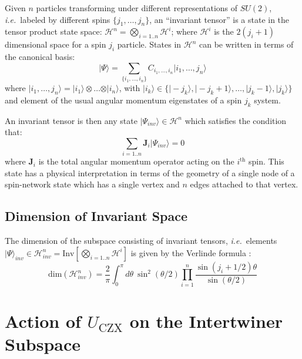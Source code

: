 \documentclass[preprint]{SciPost}
\newcommand{\ie}{\textit{i.e.}~}
\newcommand{\mc}[1]{\mathcal{#1}}
\newcommand{\vect}[1]{\boldsymbol{#1}}
\newcommand{\ket}[1]{\vert #1 \rangle}
\theoremstyle{plain} %
\begin{document}
Given $ n $ particles transforming under different representations of $ SU(2) $, \ie labeled by different spins $ \{j_1,\ldots,j_n \} $, an ``invariant tensor'' is a state in the tensor product state space: $ \mc{H}^n = \underset{i=1..n}{\bigotimes} \mc{H}^i $; where $ \mc{H}^i $ is the $ 2(j_i+1) $ dimensional space for a spin $ j_i $ particle. States in $ \mc{H}^n $ can be written in terms of the canonical basis:
\begin{equation}\label{eqn:n-body-state}
	\ket{\Psi} = \sum_{\{i_1,\ldots,i_n\}} C_{i_1,\ldots,i_n} \ket{i_1,\ldots,j_n}
\end{equation}
where $ \ket{i_1,\ldots,j_n} = \ket{i_1} \otimes \ldots \otimes \ket{i_n} $, with $ \ket{i_k} \in \{\ket{-j_k}, \ket{-j_k + 1}, \ldots, \ket{j_k - 1}, \ket{j_k}\} $ and element of the usual angular momentum eigenstates of a spin $ j_k $ system.

An invariant tensor is then any state $ \ket{\Psi_{inv}} \in \mc{H}^n $ which satisfies the condition \cite[App. A]{Li2017Invariant} that:
\begin{equation}\label{eqn:quantum-closure-condition}
	\sum_{i=1..n} \vect{J}_i \ket{\Psi_{inv}} = 0
\end{equation}
where $ \vect{J}_i $ is the total angular momentum operator acting on the $ i^\text{th} $ spin. This state has a physical interpretation in terms of the geometry of a single node of a spin-network state which has a single vertex and $ n $ edges attached to that vertex.

\subsection*{Dimension of Invariant Space}

The dimension of the subspace consisting of invariant tensors, \ie elements $ \ket{\Psi}_{inv} \in \mc{H}^n_{inv} = \text{Inv}\left[\underset{i=1..n}{\bigotimes} \mc{H}^i\right] $ is given by the Verlinde formula \cite{Verlinde1988Fusion}:
\begin{equation}\label{eqn:verlinde-formulat}
	\text{dim} (\mc{H}^n_{inv}) = \frac{2}{\pi} \int_{0}^{\pi} d\theta~\sin^2(\theta/2) \prod_{i=1}^{n} \frac{\sin(j_i + 1/2)\theta}{\sin(\theta/2)}
\end{equation}

\nolinenumbers

\section{Action of $U_{\mathrm{CZX}}$ on the Intertwiner Subspace}\label{subsec:czx-intertwiner}
\end{document}
